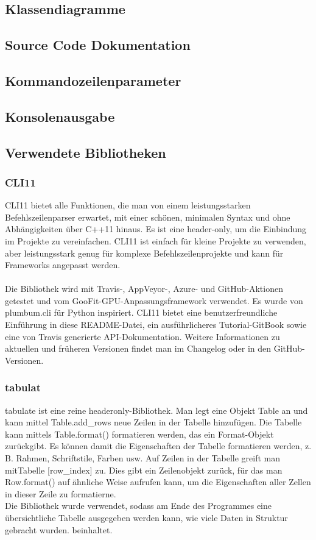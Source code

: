 \documentclass[a4paper,12pt]{article}
\begin{document}
\subsection{Klassendiagramme}

\subsection{Source Code Dokumentation}

\subsection{Kommandozeilenparameter}


\subsection{Konsolenausgabe}

\newpage
\noindent
\subsection{Verwendete Bibliotheken}
\subsubsection{CLI11}
CLI11 bietet alle Funktionen, die man von einem leistungsstarken Befehlszeilenparser erwartet, mit einer schönen, minimalen Syntax und ohne 
Abhängigkeiten über C++11 hinaus. Es ist eine header-only, um die Einbindung im Projekte zu 
vereinfachen. CLI11 ist einfach für kleine Projekte zu verwenden, aber leistungsstark genug für komplexe Befehlszeilenprojekte und kann für Frameworks angepasst werden. \\\\
Die Bibliothek wird mit Travis-, AppVeyor-, Azure- und GitHub-Aktionen getestet und vom GooFit-GPU-Anpassungsframework verwendet. 
Es wurde von plumbum.cli für Python inspiriert. CLI11 bietet eine benutzerfreundliche Einführung in diese README-Datei, ein ausführlicheres Tutorial-GitBook sowie eine von Travis generierte API-Dokumentation. 
Weitere Informationen zu aktuellen und früheren Versionen findet man im Changelog oder in den GitHub-Versionen.
\subsubsection{tabulat}
tabulate ist eine reine headeronly-Bibliothek. 
Man legt eine Objekt Table an und kann mittel Table.add\_rows neue Zeilen in der Tabelle hinzufügen.
Die Tabelle kann mittels Table.format() formatieren werden, das ein Format-Objekt zurückgibt. 
Es können damit die Eigenschaften der Tabelle formatieren werden, z. B. Rahmen, Schriftstile, Farben usw.
Auf Zeilen in der Tabelle greift man mitTabelle [row\_index] zu. Dies gibt ein Zeilenobjekt zurück, für das man Row.format() auf ähnliche Weise aufrufen kann, um die Eigenschaften aller Zellen in dieser Zeile zu formatierne.\\
Die Bibliothek wurde verwendet, sodass am Ende des Programmes eine übersichtliche Tabelle ausgegeben werden kann, wie viele Daten in Struktur gebracht wurden.
beinhaltet.
\end{document}
